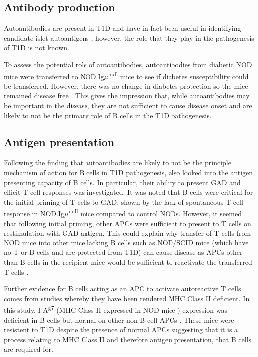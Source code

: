 \subsection{Antibody production}

Autoantibodies are present in T1D and have in fact been useful in identifying candidate islet autoantigens \citep{Roep2012}, however, the role that they play in the pathogenesis of T1D is not known.

To assess the potential role of autoantibodies, autoantibodies from diabetic NOD mice were transferred to NOD.Ig$\mu$\textsuperscript{null} mice to see if diabetes susceptibility could be transferred.
However, there was no change in diabetes protection so the mice remained disease free \citep{Serreze1998}.
This gives the impression that, while autoantibodies may be important in the disease, they are not sufficient to cause disease onset and are likely to not be the primary role of B cells in the T1D pathogenesis.

\subsection{Antigen presentation}

Following the finding that autoantibodies are likely to not be the principle mechanism of action for B cells in T1D pathogenesis, \citet{Serreze1998} also looked into the antigen presenting capacity of B cells.
In particular, their ability to present GAD and ellicit T cell responses was investigated.
It was noted that B cells were critical for the initial priming of T cells to GAD, shown by the lack of spontaneous T cell response in NOD.Ig$\mu$\textsuperscript{null} mice compared to control NODs.
However, it seemed that following initial priming, other APCs were sufficient to present to T cells on restimulation with GAD antigen.
This could explain why transfer of T cells from NOD mice into other mice lacking B cells such as NOD/SCID mice (which have no T or B cells and are protected from T1D) can cause disease as APCs other than B cells in the recipient mice would be sufficient to reactivate the transferred T cells \citep{Charlton2001}.

Further evidence for B cells acting as an APC to activate autoreactive T cells comes from studies whereby they have been rendered MHC Class II deficient.
In this study, I-A\textsuperscript{g7} (MHC Class II expressed in NOD mice \citep{Stratmann2005}) expression was deficient in B cells but normal on other non-B cell APCs \citep{Noorchashm1999}.
These mice were resistent to T1D despite the presence of normal APCs suggesting that it is a process relating to MHC Class II and therefore antigen presentation, that B cells are required for.

